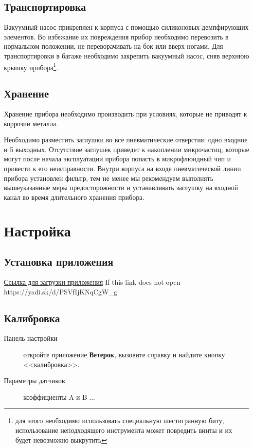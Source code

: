 \documentclass[twoside, 12pt, a4paper]{refart}
\begin{document}
\subsection{Транспортировка}

Вакуумный насос прикреплен к корпуса с помощью силиконовых демпфирующих элементов. Во избежание их повреждения прибор необходимо перевозить в нормальном положении, не переворачивать на бок или вверх ногами. Для транспортировки в багаже необходимо закрепить вакуумный насос, сняв верхнюю крышку прибора\footnote{для этого необходимо использовать специальную шестигранную биту, использование неподходящего инструмента может повредить винты и их будет невозможно выкрутить}.

\subsection{Хранение}

Хранение прибора необходимо производить при условиях, которые не приводят к коррозии металла.

Необходимо разместить заглушки во все пневматические отверстия: одно входное и 5 выходных. Отсутствие заглушек приведет к накоплении микрочастиц, которые могут после начала эксплуатации прибора попасть в микрофлюидный чип и привести к его неисправности. Внутри корпуса на входе пневматической линии прибора установлен фильтр, тем не менее мы рекомендуем выполнять вышеуказанные меры предосторожности и устанавливать заглушку на входной канал во время длительного хранения прибора.


\newpage
\section{Настройка}
\label{setup}

\subsection{Установка приложения}

\href{https://yadi.sk/d/PSVfIjKNqCgW_g}{Ссылка для загрузки приложения}
If this link does not open - https://yadi.sk/d/PSVfIjKNqCgW_g


\subsection{Калибровка}
 


\begin{description}

\item[Панель настройки]
        откройте приложение \textbf{Ветерок}, вызовите справку и найдите кнопку <<калибровка>>.
        
\item[Параметры датчиков]
        коэффициенты A и B ... 
        

\end{description}
\end{document}
